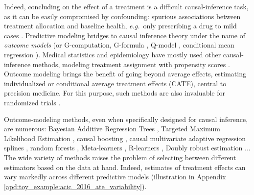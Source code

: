 \documentclass[a4paper,num-refs]{oup-contemporary}%
\newcommand{\eg}{\emph{e.g.}}
\begin{document}

Indeed, concluding on the effect of a treatment is a difficult
causal-inference task, as it can be easily compromised by confounding:
spurious associations between treatment
allocation and baseline health, \eg~only prescribing a drug to mild cases
\cite{hernan_causal_2020,vanderweele2019principles}.
Predictive modeling bridges to causal inference theory under the name of
\emph{outcome models} (or G-computation,
G-formula \cite{robins_role_1986}, Q-model
\cite{snowden_implementation_2011}, conditional mean regression
\cite{wendling_comparing_2018}).
Medical statistics and epidemiology have mostly used other
causal-inference methods, modeling treatment assignment
with propensity scores \cite{rosenbaum_central_1983,austin_moving_2015,casucci2018estimating,grose_use_2020}. Outcome modeling brings
the benefit of going
beyond average effects, estimating individualized or conditional average
treatment effects (CATE), central to precision medicine.
%
For this purpose, such methods are also invaluable for randomized trials
\cite{su2018random,lamont2018identification,hoogland2021tutorial}.


Outcome-modeling methods, even when specifically designed for causal
inference, are numerous: Bayesian Additive Regression Trees
\cite{hill_bayesian_2011}, Targeted Maximum Likelihood Estimation
\cite{laan_targeted_2011,schuler_targeted_2017}, causal boosting
\cite{powers_methods_2018}, causal multivariate adaptive regression
splines \cite{powers_methods_2018}, random forests
\cite{wager_estimation_2018, athey_generalized_2019},
Meta-learners \cite{kunzel_metalearners_2019}, R-learners
\cite{nie_quasioracle_2017}, Doubly robust estimation
\cite{chernozhukov_double_2018}...
The wide variety of methods raises the problem
of selecting between different estimators based on the data at hand. %
%
Indeed, estimates of treatment effects can vary markedly across different
predictive models \cite{fang2019applying,dorie_automated_2019} (illustration in
Appendix \ref{apd:toy_example:acic_2016_ate_variability}).
\end{document}
